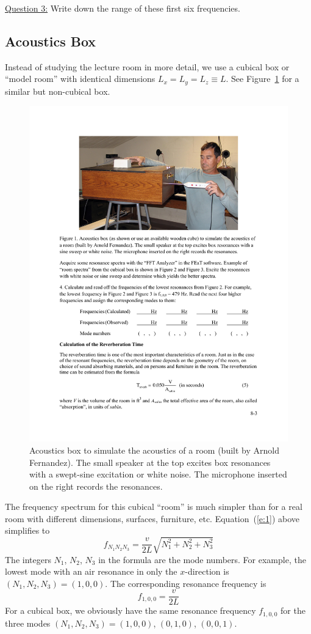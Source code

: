 \documentclass[11pt]{NSF}
\def\be{\begin{equation}}
\def\ee{\end{equation}}
\begin{document}
\underline{Question 3:}  Write down the range of these first six frequencies.

\subsection{Acoustics Box}

Instead of studying the lecture room in more detail, we use a cubical
box or ``model room” with identical dimensions 
$L_x =L_y = L_z \equiv L$.
See Figure~\ref{f:1} for a similar but non-cubical box. 
%
\begin{figure}[hbtp]
\begin{center}
\includegraphics[width=.7\textwidth]{fig8_1}
\caption{Acoustics box to
simulate the acoustics of a room (built by Arnold Fernandez).  The
small speaker at the top excites box resonances with a swept-sine 
excitation or white noise. 
The microphone inserted on the right records the resonances.}
\label{f:1}
\end{center}
\end{figure}
%
The frequency spectrum for this cubical ``room” is much simpler than
for a real room with different dimensions, surfaces, furniture, etc.
Equation~(\ref{e:1}) above simplifies to
%
\be
f_{N_1N_2N_3} = \frac{v}{2L}\sqrt{N_1^2 + N_2^2 + N_3^2}
\label{e:3}
\ee
%
The integers $N_1$, $N_2$, $N_3$ in the formula are the mode numbers. 
For example, the lowest mode with an air resonance in only the 
$x$-direction is $(N_1, N_2, N_3) = (1, 0, 0)$. 
The corresponding resonance frequency is
%
\be
f_{1,0,0} = \frac{v}{2L}
\ee
%
For a cubical box, we obviously have the same resonance frequency 
$f_{1,0,0}$ for the three modes $(N_1, N_2, N_3) = (1,0,0)$, $(0,1,0)$, $(0,0,1)$.
\end{document}
